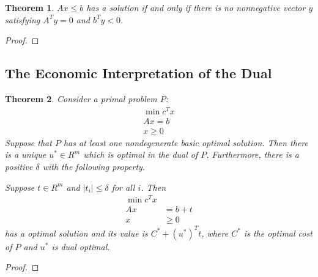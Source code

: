 \documentclass[11pt]{article} %
\theoremstyle{plain}%
\newtheorem{thm}{Theorem}[section]
\theoremstyle{definition}
\theoremstyle{remark}
\begin{document}
\begin{thm}
$Ax \leq b$ has a solution if and only if there is no nonnegative vector $y$ satisfying 
$A^T y = 0$ and $ b^T y < 0$. 
\end{thm}

\begin{proof}

\end{proof}

\subsection{The Economic Interpretation of the Dual}

\begin{thm}
Consider a primal problem $P$: 
\begin{align*}
\min c^T x \\
Ax = b \\
x \geq 0
\end{align*}
Suppose that $P$ has at least one nondegenerate basic optimal solution. Then there is
a unique $u^* \in R^m$ which is optimal in the dual of $P$. Furthermore, there is 
a positive $\delta$ with the following property. 

Suppose $t \in R^m$ and $\mid t_i \mid \leq \delta$ for all $i$. Then 
\begin{align*}
\min c^T x \\
Ax &= b + t \\
x &\geq 0
\end{align*}
has a optimal solution and its value is $C^* + (u^*)^T t$, where $C^*$ is the optimal 
cost of $P$ and $u^*$ is dual optimal. 
\end{thm}

\begin{proof}

\end{proof}
\end{document}

